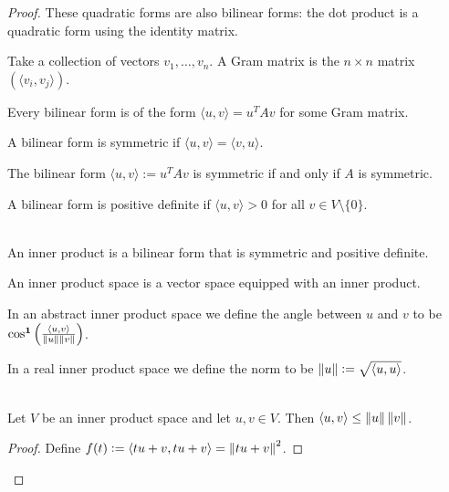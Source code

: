 \begin{proof}
These quadratic forms are also bilinear forms: the dot product is a quadratic form using the
identity matrix.

\begin{definition*}
  Take a collection of vectors $v_1, \ldots, v_n$. A Gram matrix is the $n \times n$ matrix
  $(\langle v_i, v_j \rangle)$.
\end{definition*}

\begin{theorem*}
  Every bilinear form is of the form $\langle u, v \rangle = u^TAv$ for some Gram matrix.
\end{theorem*}

\begin{definition*}
  A bilinear form is symmetric if $\langle u, v \rangle = \langle v, u \rangle$.
\end{definition*}

\begin{theorem*}
  The bilinear form $\langle u, v \rangle := u^TAv$ is symmetric if and only if $A$ is symmetric.
\end{theorem*}

\begin{definition*}
  A  bilinear form is positive definite if $\langle u, v \rangle > 0$ for all
  $v \in V \setminus \{0\}$. 
\end{definition*}

\begin{definition*}~\\
  An inner product is a bilinear form that is symmetric and positive definite.

  An inner product space is a vector space equipped with an inner product.

  In an abstract inner product space we define the angle between $u$ and $v$ to be
  $\cos^{\mathbf 1}\Big(\frac{\langle u, v \rangle}{\left\Vert u \right\Vert\left\Vert v \right\Vert}\Big)$.

  In a real inner product space we define the norm to be $\left\Vert u \right\Vert := \sqrt{\langle u, u \rangle}$.
\end{definition*}

\begin{theorem*}~\\
  Let $V$ be an inner product space and let $u, v \in V$. Then
  $\langle u, v \rangle \leq \left\Vert u \right\Vert \left\Vert v \right\Vert$.
\end{theorem*}

\begin{proof}
  Define $f(t) := \langle tu + v, tu + v \rangle = \left\Vert tu +v \right\Vert^2$.


\end{proof}
\end{proof}
